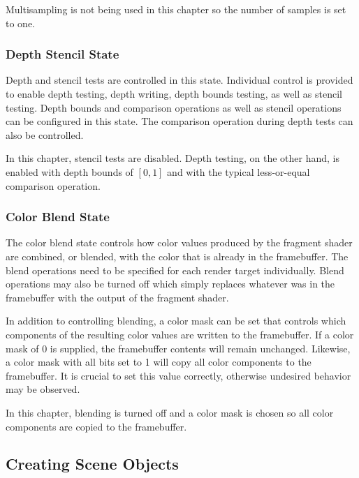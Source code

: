         Multisampling is not being used in this chapter so the number of samples is set to one.

      \subsubsection{Depth Stencil State}
        Depth and stencil tests are controlled in this state.
        Individual control is provided to enable depth testing, depth writing, depth bounds testing, as well as stencil testing.
        Depth bounds and comparison operations as well as stencil operations can be configured in this state.
        The comparison operation during depth tests can also be controlled.

        In this chapter, stencil tests are disabled.
        Depth testing, on the other hand, is enabled with depth bounds of $[0, 1]$ and with the typical less-or-equal comparison operation.

      \subsubsection{Color Blend State}
        The color blend state controls how color values produced by the fragment shader are combined, or blended, with the color that is already in the framebuffer.
        The blend operations need to be specified for each render target individually.
        Blend operations may also be turned off which simply replaces whatever was in the framebuffer with the output of the fragment shader.

        In addition to controlling blending, a color mask can be set that controls which components of the resulting color values are written to the framebuffer.
        If a color mask of 0 is supplied, the framebuffer contents will remain unchanged.
        Likewise, a color mask with all bits set to 1 will copy all color components to the framebuffer.
        It is crucial to set this value correctly, otherwise undesired behavior may be observed.

        In this chapter, blending is turned off and a color mask is chosen so all color components are copied to the framebuffer.

    \subsection{Creating Scene Objects}
      \tbd

